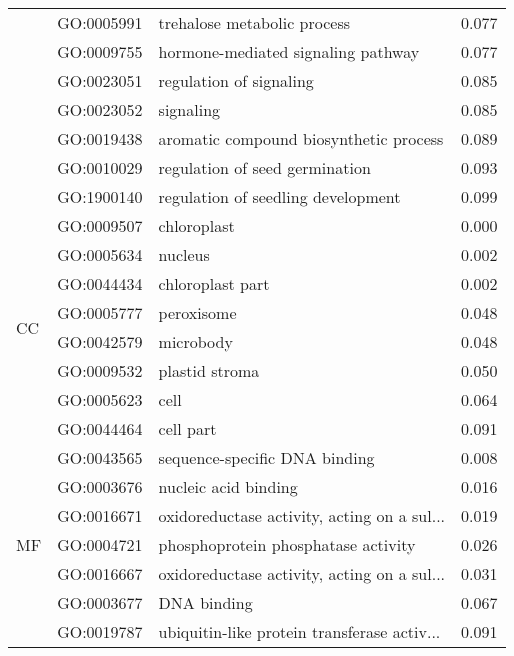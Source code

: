 \begin{longtable}{lllr}
   & GO:0005991 &                  trehalose metabolic process &         0.077 \\
   & GO:0009755 &           hormone-mediated signaling pathway &         0.077 \\
   & GO:0023051 &                      regulation of signaling &         0.085 \\
   & GO:0023052 &                                    signaling &         0.085 \\
   & GO:0019438 &       aromatic compound biosynthetic process &         0.089 \\
   & GO:0010029 &               regulation of seed germination &         0.093 \\
   & GO:1900140 &           regulation of seedling development &         0.099 \\
\cline{1-4}
\multirow{8}{*}{CC} & GO:0009507 &                                  chloroplast &         0.000 \\
   & GO:0005634 &                                      nucleus &         0.002 \\
   & GO:0044434 &                             chloroplast part &         0.002 \\
   & GO:0005777 &                                   peroxisome &         0.048 \\
   & GO:0042579 &                                    microbody &         0.048 \\
   & GO:0009532 &                               plastid stroma &         0.050 \\
   & GO:0005623 &                                         cell &         0.064 \\
   & GO:0044464 &                                    cell part &         0.091 \\
\cline{1-4}
\multirow{7}{*}{MF} & GO:0043565 &                sequence-specific DNA binding &         0.008 \\
   & GO:0003676 &                         nucleic acid binding &         0.016 \\
   & GO:0016671 &  oxidoreductase activity, acting on a sul... &         0.019 \\
   & GO:0004721 &          phosphoprotein phosphatase activity &         0.026 \\
   & GO:0016667 &  oxidoreductase activity, acting on a sul... &         0.031 \\
   & GO:0003677 &                                  DNA binding &         0.067 \\
   & GO:0019787 &  ubiquitin-like protein transferase activ... &         0.091 \\
\end{longtable}
